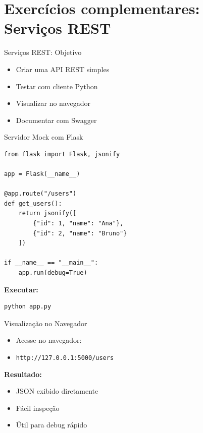 \documentclass{beamer}
\begin{document}
\section{Exercícios complementares: Serviços REST}

\begin{frame}{Serviços REST: Objetivo}
\begin{itemize}
    \item Criar uma API REST simples
    \item Testar com cliente Python
    \item Visualizar no navegador
    \item Documentar com Swagger
\end{itemize}
\end{frame}


\begin{frame}[fragile]{Servidor Mock com Flask}

\begin{verbatim}
from flask import Flask, jsonify

app = Flask(__name__)

@app.route("/users")
def get_users():
    return jsonify([
        {"id": 1, "name": "Ana"},
        {"id": 2, "name": "Bruno"}
    ])

if __name__ == "__main__":
    app.run(debug=True)
\end{verbatim}

\vspace{0.3cm}

\textbf{Executar:}

\begin{verbatim}
python app.py
\end{verbatim}

\end{frame}

\begin{frame}{Visualização no Navegador}

\begin{itemize}
    \item Acesse no navegador:
    \item \texttt{http://127.0.0.1:5000/users}
\end{itemize}

\vspace{0.5cm}

\textbf{Resultado:}
\begin{itemize}
    \item JSON exibido diretamente
    \item Fácil inspeção
    \item Útil para debug rápido
\end{itemize}

\end{frame}
\end{document}
